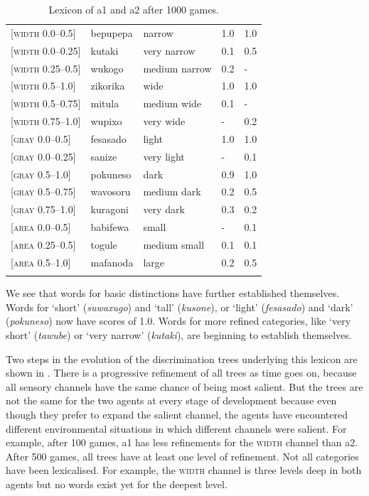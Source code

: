 \begin{table}
\begin{center}
\begin{tabular}{ l  l  l  l  l }
\lsptoprule
{}[\textsc{width} 0.0–0.5]&bepupepa&narrow & 1.0&1.0\\ 
{}[\textsc{width} 0.0–0.25]&kutaki&very narrow & 0.1&0.5\\ 
{}[\textsc{width} 0.25–0.5]&wukogo&medium narrow & 0.2&-\\ 
{}[\textsc{width} 0.5–1.0]&zikorika&wide & 1.0&1.0\\ 
{}[\textsc{width} 0.5–0.75]&mitula&medium wide &0.1&-\\ 
{}[\textsc{width} 0.75–1.0]&wupixo&very wide & -&0.2\\ 
{}[\textsc{gray} 0.0–0.5]&fesasado&light & 1.0&1.0\\ 
{}[\textsc{gray} 0.0–0.25]&sanize&very light & -&0.1\\ 
{}[\textsc{gray} 0.5–1.0]&pokuneso&dark &0.9&1.0\\ 
{}[\textsc{gray} 0.5–0.75]&wavosoru&medium dark & 0.2&0.5\\ 
{}[\textsc{gray} 0.75–1.0]&kuragoni&very dark &0.3&0.2\\ 
{}[\textsc{area} 0.0–0.5]&babifewa&small & -&0.1\\ 
{}[\textsc{area} 0.25–0.5]&togule&medium small & 0.1&0.1\\ 
{}[\textsc{area} 0.5–1.0]&mafanoda&large & 0.2&0.5\\ 
\lspbottomrule
\end{tabular}
\caption{\label{tab:lex500b}Lexicon of {\bfshape  a1} and {\bfshape  a2} after 1000 games.}
\end{center}
\end{table}

We see that words for  basic distinctions have further established
themselves. Words for `short' (\emph{suwaxugo}) and `tall' (\emph{kusone}), or `light' (\emph{fesasado}) and `dark' (\emph{pokuneso}) now have scores of 1.0. Words for more refined categories, like `very short' (\emph{tawube}) or `very narrow' (\emph{kutaki}), are beginning to establish themselves.  

Two steps in the evolution of the discrimination trees
underlying this lexicon are shown in .
There is a progressive refinement 
of all trees as time goes on, 
because all sensory channels have the same chance
of being most salient. But the trees are not 
the same for the two agents at every stage
of development because even though they prefer to expand
the salient channel, the agents have encountered 
different environmental situations in which different
channels were salient. For example, after 100 
games, {\bfshape  a1} has less refinements for the 
\textsc{width} channel than {\bfshape  a2}. 
After 500 games, all trees 
have at least one level of refinement. Not all 
categories have been lexicalised. For example, the 
\textsc{width} channel is three levels deep in both 
agents but no words exist yet for the deepest 
level. 


